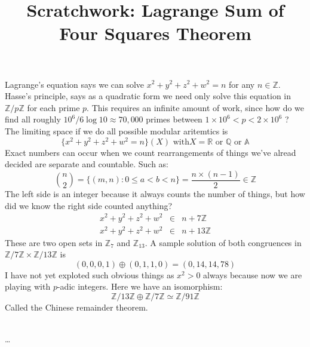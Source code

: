 \documentclass[12pt]{article}
\title{Scratchwork: Lagrange Sum of Four Squares Theorem}
\date{}
\begin{document}
\sffamily

\maketitle

\noindent Lagrange's equation says we can solve $x^2 + y^2 + z^2 + w^2 = n$ for any $n \in \mathbb{Z}$.  Hasse's principle, says as a quadratic form we need only solve this equation in $\mathbb{Z}/p\mathbb{Z}$ for each prime $p$.  This requires an infinite amount of work, since how do we find all roughly $10^6/6 \log 10 \approx 70,000 $ primes between $1 \times 10^6 < p < 2 \times 10^6$ ?  The limiting space if we do all possible modular aritemtics is
$$  \{ x^2 + y^2 + z^2 + w^2 = n \}(X) \text{ with} X = \mathbb{R} \text{ or }\mathbb{Q} \text{ or } \mathbb{A}$$
Exact numbers can occur when we count rearrangements of things we've alread decided are separate and countable.  Such as:
$$ \binom{n}{2} = \big\{ (m,n) : 0 \leq a < b < n \big\} =  \frac{ n \times (n-1)} {2} \in \mathbb{Z}$$
The left side is an integer because it always counts the number of things, but how did we know the right side counted anything?
\begin{eqnarray*}
x^2 + y^2 + z^2 + w^2 &\in& n + 7 \mathbb{Z}\\
x^2 + y^2 + z^2 + w^2 &\in& n + 13 \mathbb{Z}
\end{eqnarray*}
These are two open sets in $\mathbb{Z}_7$ and $\mathbb{Z}_{13}$. A sample solution of both congruences in $\mathbb{Z}/7\mathbb{Z} \times \mathbb{Z}/13\mathbb{Z}$ is 
$$ (0,0,0,1) \oplus (0,1,1,0) = (0, 14, 14 , 78 )$$
I have not yet exploted such obvious things as $x^2 > 0$ always because now we are playing with $p$-adic integers.  Here we have an isomorphism:
$$ \mathbb{Z}/13\mathbb{Z} \oplus \mathbb{Z}/7\mathbb{Z} \simeq \mathbb{Z}/91\mathbb{Z}  $$
Called the Chinese remainder theorem. 
\\ \\

\begin{thebibliography}{}

\item \dots


\end{thebibliography}
\end{document}
